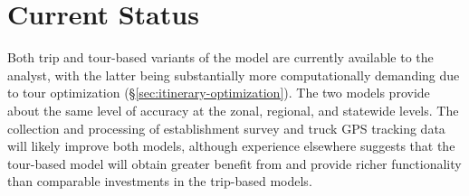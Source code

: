 \section{Current Status}
Both trip and tour-based variants of the model are currently available to the analyst, with the latter being substantially more computationally demanding due to tour optimization (\S\ref{sec:itinerary-optimization}). The two models provide about the same level of accuracy at the zonal, regional, and statewide levels. The collection and processing of establishment survey and truck GPS tracking data will likely improve both models, although experience elsewhere suggests that the tour-based model will obtain greater benefit from and provide richer functionality than comparable investments in the trip-based models. 
